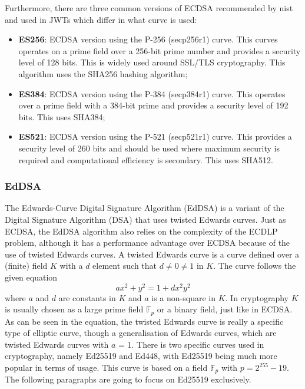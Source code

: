 Furthermore, there are three common versions of ECDSA recommended by \gls{nist} and used in JWTs which differ in what curve is used:
\begin{itemize}
    \item \textbf{ES256}: ECDSA version using the P-256 (secp256r1) curve. This curves operates on a prime field over a 256-bit prime number and provides a security level of 128 bits. This is widely used around SSL/TLS cryptography. This algorithm uses the SHA256 hashing algorithm;
    \item \textbf{ES384}: ECDSA version using the P-384 (secp384r1) curve. This operates over a prime field with a 384-bit prime and provides a security level of 192 bits. This uses SHA384;
    \item \textbf{ES521}: ECDSA version using the P-521 (secp521r1) curve. This provides a security level of 260 bits and should be used where maximum security is required and computational efficiency is secondary. This uses SHA512.
\end{itemize} 
\cite{ecdsa} \cite{rfc6979-ecdsa} \cite{rfc7515-jws}


\subsubsection{EdDSA}
The Edwards-Curve Digital Signature Algorithm (EdDSA) is a variant of the Digital Signature Algorithm (DSA) that uses twisted Edwards curves. Just as ECDSA, the EdDSA algorithm also relies on the complexity of the ECDLP problem, although it has a performance advantage over ECDSA because of the use of twisted Edwards curves.
A twisted Edwards curve is a curve defined over a (finite) field $K$ with a $d$ element such that $d \neq 0 \neq 1$ in $K$. The curve follows the given equation
\[ax^2 + y^2 = 1 + dx^2y^2\]
where $a$ and $d$ are constants in $K$ and $a$ is a non-square in $K$. In cryptography $K$ is usually chosen as a large prime field $\mathbb{F}_p$ or a binary field, just like in ECDSA. As can be seen in the equation, the twisted Edwards curve is really a specific type of elliptic curve, though a generalisation of Edwards curves, which are twisted Edwards curves with $a$ = 1. There is two specific curves used in cryptography, namely Ed25519 and Ed448, with Ed25519 being much more popular in terms of usage. This curve is based on a field $\mathbb{F}_p$ with $p = 2^{255}-19$. \cite{twisted-ec} The following paragraphs are going to focus on Ed25519 exclusively.

